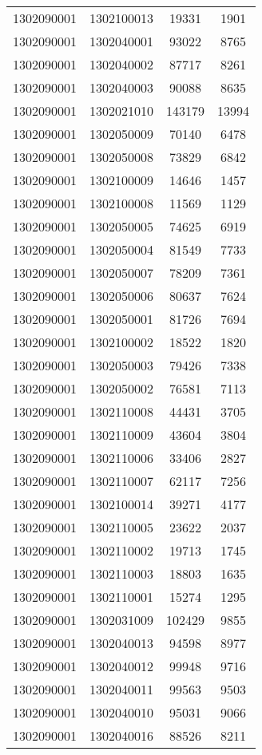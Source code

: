 \begin{longtable}[h]{llcc}
		1302090001 & 1302100013 & 19331 & 1901\\
		1302090001 & 1302040001 & 93022 & 8765\\
		1302090001 & 1302040002 & 87717 & 8261\\
		1302090001 & 1302040003 & 90088 & 8635\\
		1302090001 & 1302021010 & 143179 & 13994\\
		1302090001 & 1302050009 & 70140 & 6478\\
		1302090001 & 1302050008 & 73829 & 6842\\
		1302090001 & 1302100009 & 14646 & 1457\\
		1302090001 & 1302100008 & 11569 & 1129\\
		1302090001 & 1302050005 & 74625 & 6919\\
		1302090001 & 1302050004 & 81549 & 7733\\
		1302090001 & 1302050007 & 78209 & 7361\\
		1302090001 & 1302050006 & 80637 & 7624\\
		1302090001 & 1302050001 & 81726 & 7694\\
		1302090001 & 1302100002 & 18522 & 1820\\
		1302090001 & 1302050003 & 79426 & 7338\\
		1302090001 & 1302050002 & 76581 & 7113\\
		1302090001 & 1302110008 & 44431 & 3705\\
		1302090001 & 1302110009 & 43604 & 3804\\
		1302090001 & 1302110006 & 33406 & 2827\\
		1302090001 & 1302110007 & 62117 & 7256\\
		1302090001 & 1302100014 & 39271 & 4177\\
		1302090001 & 1302110005 & 23622 & 2037\\
		1302090001 & 1302110002 & 19713 & 1745\\
		1302090001 & 1302110003 & 18803 & 1635\\
		1302090001 & 1302110001 & 15274 & 1295\\
		1302090001 & 1302031009 & 102429 & 9855\\
		1302090001 & 1302040013 & 94598 & 8977\\
		1302090001 & 1302040012 & 99948 & 9716\\
		1302090001 & 1302040011 & 99563 & 9503\\
		1302090001 & 1302040010 & 95031 & 9066\\
		1302090001 & 1302040016 & 88526 & 8211\\

\end{longtable}
